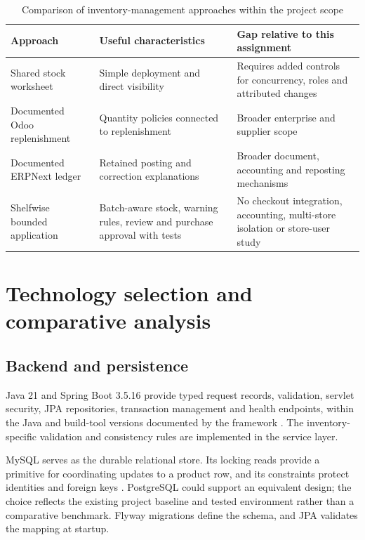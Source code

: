 \begin{table}[htbp]\centering\small{}\setlength{\tabcolsep}{3pt}\renewcommand{\arraystretch}{1.25}
\caption{Comparison of inventory-management approaches within the project scope}\label{tab:alternatives}
\begin{tabular}{>{\raggedright\arraybackslash}p{}>{\raggedright\arraybackslash}p{}>{\raggedright\arraybackslash}p{}}
\toprule
\textbf{Approach} & \textbf{Useful characteristics} & \textbf{Gap relative to this assignment} \\
\midrule
\leavevmode{}Shared stock worksheet & \leavevmode{}Simple deployment and direct visibility & \leavevmode{}Requires added controls for concurrency, roles and attributed changes \\
\leavevmode{}Documented Odoo replenishment & \leavevmode{}Quantity policies connected to replenishment & \leavevmode{}Broader enterprise and supplier scope \\
\leavevmode{}Documented ERPNext ledger & \leavevmode{}Retained posting and correction explanations & \leavevmode{}Broader document, accounting and reposting mechanisms \\
\leavevmode{}Shelfwise bounded application & \leavevmode{}Batch-aware stock, warning rules, review and purchase approval with tests & \leavevmode{}No checkout integration, accounting, multi-store isolation or store-user study \\
\bottomrule\end{tabular}\end{table}

\FloatBarrier

\section{Technology selection and comparative analysis}

\subsection{Backend and persistence}

Java 21 and Spring Boot 3.5.16 provide typed request records, validation, servlet security, JPA repositories, transaction management and health endpoints, within the Java and build-tool versions documented by the framework \citep{springboot}. The inventory-specific validation and consistency rules are implemented in the service layer.


MySQL serves as the durable relational store. Its locking reads provide a primitive for coordinating updates to a product row, and its constraints protect identities and foreign keys \citep{mysql-locks}. PostgreSQL could support an equivalent design; the choice reflects the existing project baseline and tested environment rather than a comparative benchmark. Flyway migrations define the schema, and JPA validates the mapping at startup.


